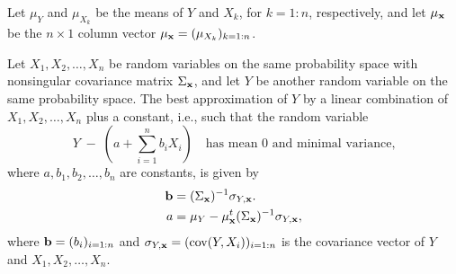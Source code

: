 
Let $\mu_Y$ and $\mu_{X_k}$ be the means of $Y$ and $X_k$, for $k=1:n$, respectively, and
let $\mu_{\mathbf{x}}$ be the $n\times1$ column vector $\mu_{\mathbf{x}} = (\mu_{X_k})_{k=1:n}$.

\begin{lemma}
Let $X_1, X_2, \ldots, X_n$ be random variables on the same probability space with
nonsingular covariance matrix $\Sigma_{\mathbf{x}}$, and let $Y$ be another random variable on
the same probability space. The best approximation of $Y$ by a linear combination of
$X_1, X_2, \ldots, X_n$ plus a constant, i.e., such that the random variable
\[
Y \;-\; \left(a+\sum_{i=1}^n b_iX_i\right) \quad \text{has mean $0$ and minimal
variance,}
\]
where $a, b_1, b_2, \ldots, b_n$ are constants, is given by
\begin{align}
\mathbf{b} &= (\Sigma_{\mathbf{x}})^{-1}\sigma_{Y,\mathbf{x}}.\\
a &= \mu_Y - \mu_{\mathbf{x}}^t(\Sigma_{\mathbf{x}})^{-1}\sigma_{Y,\mathbf{x}},
\end{align}
where $\mathbf{b} = (b_i)_{i=1:n}$ and $\sigma_{Y,\mathbf{x}} = (\operatorname{cov}(Y,X_i))_{i=1:n}$ is the
covariance vector of $Y$ and $X_1, X_2, \ldots, X_n$.
\end{lemma}

